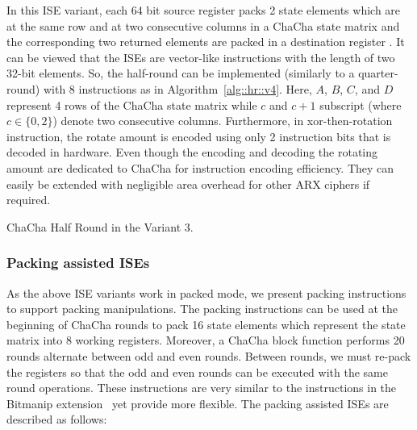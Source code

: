 In this ISE variant, each 64 bit source register packs 2 state elements which are at the same row and at two consecutive columns in a ChaCha state matrix and the corresponding two returned elements are packed in a destination register . It can be viewed that the ISEs are vector-like instructions with the length of two 32-bit elements. So, the half-round can be implemented (similarly to a quarter-round) with 8 instructions as in Algorithm~\ref{alg::hr::v4}. Here, $A$, $B$, $C$, and $D$ represent 4 rows of the ChaCha state matrix while $c$ and $c+1$ subscript (where $c \in\{0,2\}$) denote two consecutive columns.
Furthermore, in xor-then-rotation instruction, the rotate amount  is encoded using only 2 instruction bits that is decoded in hardware.
Even though the encoding and decoding the rotating amount are dedicated to ChaCha for instruction encoding efficiency. They can easily be extended with negligible area overhead for other ARX ciphers if required.

\begin{algorithm}
\BlankLine
{}
\caption{ChaCha Half Round in the Variant 3.}
\label{alg::hr::v4}
\end{algorithm}

\subsubsection{Packing assisted ISEs}
As the above ISE variants work in packed mode, we present packing instructions to support packing manipulations.
The packing instructions can be used at the beginning of ChaCha rounds to pack 16 state elements which represent the state matrix into 8 working registers. 
Moreover, a ChaCha block function performs 20 rounds alternate between odd and even rounds. Between rounds, we must re-pack the registers so that the odd and even rounds can be executed with the same round operations. These instructions are very similar to the  instructions in the Bitmanip extension~\cite{riscv:bitmanip:draft} yet provide more flexible. The packing assisted ISEs are described as follows:


